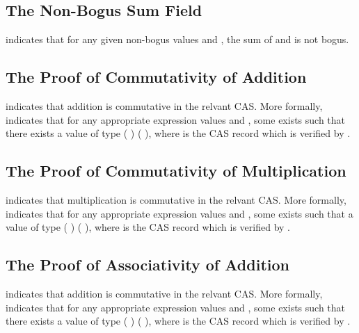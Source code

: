 \documentclass{report}
\begin{document}
\subsection{The Non-Bogus Sum Field}
 indicates that for any given non-bogus values  and , the sum of  and  is not bogus.

\subsection{The Proof of Commutativity of Addition}
 indicates that addition is commutative in the relvant CAS.  More formally,   indicates that for any appropriate expression values  and , some  exists such that there exists a value of type   \AgdaSymbol(   \AgdaSymbol) \AgdaSymbol(   \AgdaSymbol), where  is the CAS record which is verified by .

\subsection{The Proof of Commutativity of Multiplication}
 indicates that multiplication is commutative in the relvant CAS.  More formally,   indicates that for any appropriate expression values  and , some  exists such that a value of type   \AgdaSymbol(   \AgdaSymbol) \AgdaSymbol(   \AgdaSymbol), where  is the CAS record which is verified by .

\subsection{The Proof of Associativity of Addition}
 indicates that addition is commutative in the relvant CAS.  More formally,   indicates that for any appropriate expression values  and , some  exists such that there exists a value of type   \AgdaSymbol(   \AgdaSymbol) \AgdaSymbol(   \AgdaSymbol), where  is the CAS record which is verified by .
\end{document}
